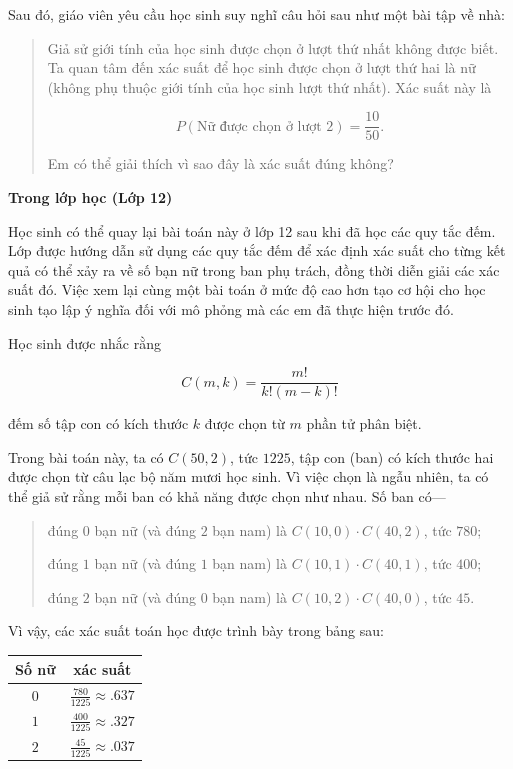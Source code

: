 \documentclass[
  10pt,
  a4paper,
  landscape,
  twoside,
  openany
]{scrbook}
\begin{document}
{Sau đó, giáo viên yêu cầu học sinh suy nghĩ câu hỏi sau như một bài tập về nhà:

\begin{quote}
  Giả sử giới tính của học sinh được chọn ở lượt thứ nhất không được biết. Ta quan tâm đến xác suất để học sinh được chọn ở lượt thứ hai là nữ (không phụ thuộc giới tính của học sinh lượt thứ nhất). Xác suất này là

  $$
  P(\text{Nữ được chọn ở lượt 2})
    =\frac{10}{50}.
  $$

  Em có thể giải thích vì sao đây là xác suất đúng không?
\end{quote}

\noindent
\textbf{Trong lớp học (Lớp 12)}

Học sinh có thể quay lại bài toán này ở lớp 12 sau khi đã học các quy tắc đếm. Lớp được hướng dẫn sử dụng các quy tắc đếm để xác định xác suất cho từng kết quả có thể xảy ra về số bạn nữ trong ban phụ trách, đồng thời diễn giải các xác suất đó. Việc xem lại cùng một bài toán ở mức độ cao hơn tạo cơ hội cho học sinh tạo lập ý nghĩa đối với mô phỏng mà các em đã thực hiện trước đó.

Học sinh được nhắc rằng

$$
  C(m,k)=\frac{m!}{k!(m-k)!}
$$

đếm số tập con có kích thước $k$ được chọn từ $m$ phần tử phân biệt.

Trong bài toán này, ta có $C(50,2)$, tức $1225$, tập con (ban) có kích thước hai được chọn từ câu lạc bộ năm mươi học sinh. Vì việc chọn là ngẫu nhiên, ta có thể giả sử rằng mỗi ban có khả năng được chọn như nhau. Số ban có---

\begin{quote}
  đúng $0$ bạn nữ (và đúng $2$ bạn nam) là $C(10,0)\cdot C(40,2)$, tức $780$;

  đúng $1$ bạn nữ (và đúng $1$ bạn nam) là $C(10,1)\cdot C(40,1)$, tức $400$;

  đúng $2$ bạn nữ (và đúng $0$ bạn nam) là $C(10,2)\cdot C(40,0)$, tức $45$.
\end{quote}

Vì vậy, các xác suất toán học được trình bày trong bảng sau:

\begin{center}
\begin{tabular}{|c|c|}
\hline
Số nữ & xác suất \\
\hline
$0$ & $\frac{780}{1225}\approx .637$ \\
\hline
$1$ & $\frac{400}{1225}\approx .327$ \\
\hline
$2$ & $\frac{45}{1225}\approx .037$ \\
\hline
\end{tabular}
\end{center}

}
\end{document}
